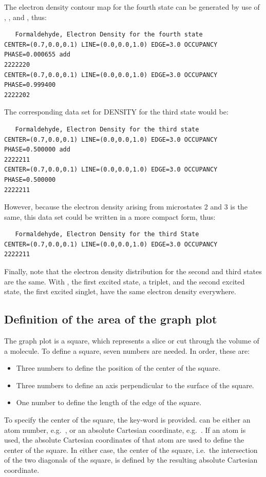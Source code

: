 The electron density contour map for the fourth state can be generated by use
of , , and , thus:
\compresstable
\begin{verbatim}
   Formaldehyde, Electron Density for the fourth state
CENTER=(0.7,0.0,0.1) LINE=(0.0,0.0,1.0) EDGE=3.0 OCCUPANCY PHASE=0.000655 add
2222220
CENTER=(0.7,0.0,0.1) LINE=(0.0,0.0,1.0) EDGE=3.0 OCCUPANCY PHASE=0.999400
2222202
\end{verbatim}
\normalsize
The corresponding data set for DENSITY for the third state would be:
\compresstable
\begin{verbatim}
   Formaldehyde, Electron Density for the third state
CENTER=(0.7,0.0,0.1) LINE=(0.0,0.0,1.0) EDGE=3.0 OCCUPANCY PHASE=0.500000 add
2222211
CENTER=(0.7,0.0,0.1) LINE=(0.0,0.0,1.0) EDGE=3.0 OCCUPANCY PHASE=0.500000
2222211
\end{verbatim}
\normalsize
However, because the electron density arising from microstates 2 and 3 is the
same, this data set could be written in a more compact form, thus:
\compresstable
\begin{verbatim}
   Formaldehyde, Electron Density for the third State
CENTER=(0.7,0.0,0.1) LINE=(0.0,0.0,1.0) EDGE=3.0 OCCUPANCY
2222211
\end{verbatim}
\normalsize
Finally, note that the electron density distribution for the second and third
states are the same.  With , the first excited state, a triplet,
and the second excited state, the first excited singlet, have the same electron
density everywhere.

\subsection{Definition of the area of the graph plot}\label{area}
The graph plot is a square, which represents a slice or cut through the volume
of a molecule. To define a square, seven numbers are needed. In order, these
are:
\begin{itemize}
\item Three numbers to define the position of the center of the square.
\item Three numbers to define an axis perpendicular to the surface of the square.
\item One number to define the length of the edge of the square.
\end{itemize}
To specify the center of the square, the key-word  is  provided.
 can be either an atom number, e.g.\ , or an
absolute Cartesian  coordinate, e.g.\ . If an atom
is used, the absolute Cartesian coordinates of that atom are used to define the
center of the square. In either case, the center of the square, i.e.\ the
intersection of the two diagonals of the square, is defined by the resulting
absolute Cartesian coordinate.

